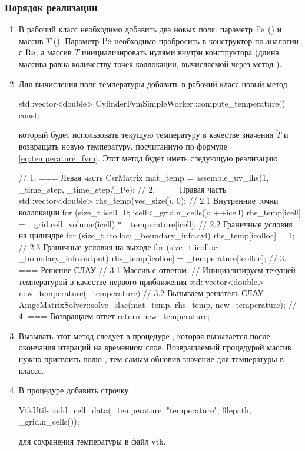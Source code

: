 \subsubsection{Порядок реализации}
\begin{enumerate}
\item
В рабочий класс необходимо добавить два новых поля: параметр $\mathrm{Pe}$ () и массив $T$ ().
Параметр $\mathrm{Pe}$ необходимо пробросить в конструктор по аналогии с $\mathrm{Re}$,
а массив $T$ инициализировать нулями внутри конструктора (длина массива равна количеству точек коллокации,
вычисляемой через метод ).
\item
Для вычисления поля температуры добавить в рабочий класс новый метод
\begin{cppcode}
std::vector<double> CylinderFvmSimpleWorker::compute_temperature() const;
\end{cppcode}
который будет использовать текущую температуру 
в качестве значения $\check T$ и возвращать новую температуру,
посчитанную по формуле \cref{eq:temperature_fvm}.
Этот метод будет иметь следующую реализацию
\begin{cppcode}
// 1. === Левая часть
CsrMatrix mat_temp = assemble_uv_lhs(1, _time_step, _time_step/_Pe);
// 2. === Правая часть
std::vector<double> rhs_temp(vec_size(), 0);
// 2.1 Внутренние точки коллокации
for (size_t icell=0; icell<_grid.n_cells(); ++icell){
	rhs_temp[icell] = _grid.cell_volume(icell) * _temperature[icell];
}
// 2.2 Граничные условия на цилиндре
for (size_t icolloc: _boundary_info.cyl){
	rhs_temp[icolloc] = 1;
}
// 2.3 Граничные условия на выходе
for (size_t icolloc: _boundary_info.output){
	rhs_temp[icolloc] = _temperature[icolloc];
}
// 3. === Решение СЛАУ
// 3.1 Массив с ответом.
//     Инициализируем текущей температурой в качестве первого приближения
std::vector<double> new_temperature(_temperature)
// 3.2 Вызываем решатель СЛАУ
AmgcMatrixSolver::solve_slae(mat_temp, rhs_temp, new_temperature);
// 4. === Возвращаем ответ
return new_temperature;
\end{cppcode}
\item
Вызывать этот метод следует в процедуре ,
которая вызывается после окончания итераций на временн\`{о}м слое.
Возвращаемый процедурой массив нужно присвоить полю ,
тем самым обновив значение для температуры в классе.
\item
В процедуре  добавить строчку
\begin{cppcode}
VtkUtils::add_cell_data(_temperature, "temperature", filepath, _grid.n_cells());
\end{cppcode}
для сохранения температуры в файл vtk.


\end{enumerate}

